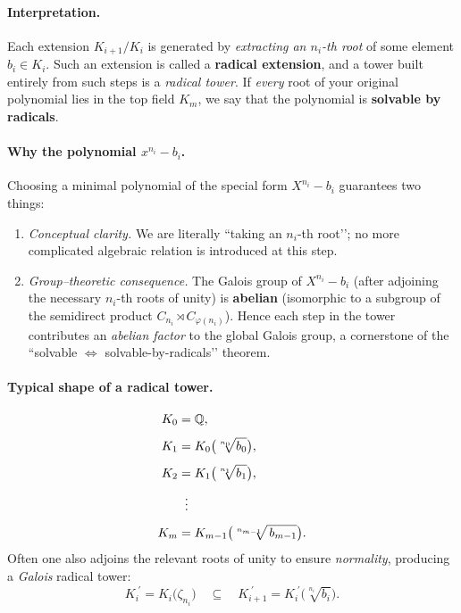 \documentclass[12pt]{article}
\theoremstyle{definition} %
\theoremstyle{plain} %
\begin{document}
\paragraph{Interpretation.}
Each extension $K_{i+1}/K_i$ is generated by \emph{extracting an
$n_i$-th root} of some element $b_i\in K_i$.
Such an extension is called a \textbf{radical extension},
and a tower built entirely from such steps is a \emph{radical tower}.
If \emph{every} root of your original polynomial lies in the top field
$K_m$, we say that the polynomial is \textbf{solvable by radicals}.

\paragraph{Why the polynomial $x^{n_i}-b_i$.}
Choosing a minimal polynomial of the special form
\(
   X^{n_i}-b_i
\)
guarantees two things:

\begin{enumerate}
   \item \emph{Conceptual clarity.}
         We are literally “taking an $n_i$-th root’’; no more complicated
         algebraic relation is introduced at this step.
   \item \emph{Group--theoretic consequence.}
         The Galois group of $X^{n_i}-b_i$ (after adjoining the
         necessary $n_i$-th roots of unity) is \textbf{abelian}
         (isomorphic to a subgroup of the semidirect product
         $C_{n_i}\rtimes C_{\varphi(n_i)}$).  
         Hence each step in the tower contributes an \emph{abelian
         factor} to the global Galois group, a cornerstone of the
         “solvable $\Leftrightarrow$ solvable-by-radicals’’ theorem.
\end{enumerate}

\paragraph{Typical shape of a radical tower.}
\[
   \begin{aligned}
      K_0 &= \Bbb Q, \\[4pt]
      K_1 &= K_0\bigl(\sqrt[n_0]{b_0}\bigr), \\[4pt]
      K_2 &= K_1\bigl(\sqrt[n_1]{b_1}\bigr), \\[4pt]
      &\;\;\vdots \\[4pt]
      K_m &= K_{m-1}\bigl(\sqrt[n_{m-1}]{\,b_{m-1}}\bigr).
   \end{aligned}
\]
Often one also adjoins the relevant roots of unity to ensure
\emph{normality}, producing a \emph{Galois} radical tower:
\[
   K_i^{\;\prime} = K_i\bigl(\zeta_{n_i}\bigr)
   \quad\subseteq\quad
   K_{i+1}^{\;\prime}
             =K_{i}^{\;\prime}\bigl(\sqrt[n_i]{b_i}\bigr).
\]
\end{document}
